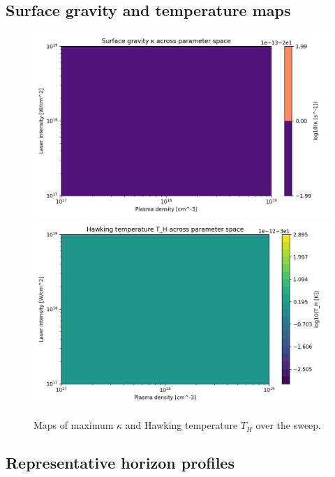 \documentclass[11pt]{article}
\begin{document}
\subsection{Surface gravity and temperature maps}
\begin{figure}[h]
  \centering
  \includegraphics[width=0.48\linewidth]{figures/horizon_analysis_kappa_map.png}\hfill
  \includegraphics[width=0.48\linewidth]{figures/horizon_analysis_TH_map.png}
  \caption{Maps of maximum $\kappa$ and Hawking temperature $T_H$ over the sweep.}
\end{figure}

\subsection{Representative horizon profiles}
\end{document}
